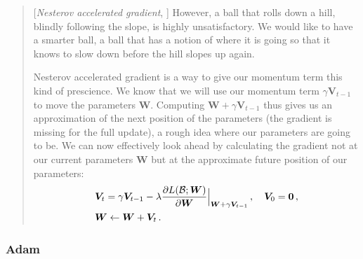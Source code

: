 \documentclass{myclass}
\numberwithin{equation}{subsection}
\begin{document}
\begin{quote}[\textit{Nesterov accelerated gradient}, \cite{ruder2017overviewgradientdescentoptimization}]
However, a ball that rolls down a hill, blindly following the slope, is highly unsatisfactory. We
would like to have a smarter ball, a ball that has a notion of where it is going so that it knows to
slow down before the hill slopes up again.

Nesterov accelerated gradient is a way to give our momentum term this kind of prescience. We know
that we will use our momentum term \(\gamma \bm{V}_{t-1}\) to move the parameters \(\bm{W}\).
Computing \(\bm{W} + \gamma \bm{V}_{t-1}\) thus gives us an approximation of the next position of
the parameters (the gradient is missing for the full update), a rough idea where our parameters are
going to be. We can now effectively look ahead by calculating the gradient not at our current
parameters \(\bm{W}\) but at the approximate future position of our parameters:
\[
\begin{split}
&\bm{V}_t = \gamma \bm{V}_{t-1} - \lambda \pdv{L(\mathcal{B}; \bm{W})}{\bm{W}}\Big|_{\bm{W} + \gamma \bm{V}_{t-1}}\,,\quad \bm{V}_0 = \bm{0}\,,\\
&\bm{W} \gets \bm{W} + \bm{V}_t\,.
\end{split}
\]
\end{quote}


\subsubsection{Adam}
\end{document}

